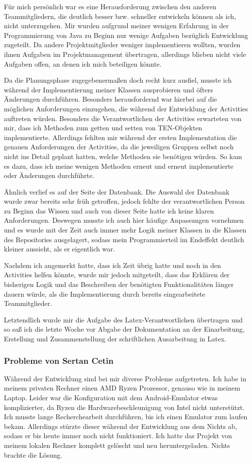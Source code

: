 Für mich persönlich war es eine Herausforderung zwischen den anderen Teammitgliedern, die deutlich besser bzw. schneller entwickeln können als ich, nicht unterzugehen. Mir wurden aufgrund meiner wenigen Erfahrung in der Programmierung von Java zu Beginn nur wenige Aufgaben bezüglich Entwicklung zugeteilt. Da andere Projektmitglieder weniger implementieren wollten, wurden ihnen Aufgaben im Projektmanagement übertragen, allerdings blieben nicht viele Aufgaben offen, an denen ich mich beteiligen könnte.

Da die Planungsphase zugegebenermaßen doch recht kurz ausfiel, musste ich während der Implementierung meiner Klassen ausprobieren und öfters Änderungen durchführen. Besonders herausfordernd war hierbei auf die möglichen Anforderungen einzugehen, die während der Entwicklung der Activities auftreten würden. Besonders die Verantwortlichen der Activities erwarteten von mir, dass ich Methoden zum getten und setten von TEN-Objekten implementierte. Allerdings fehlten mir während der ersten Implementation die genauen Anforderungen der Activities, da die jeweiligen Gruppen selbst noch nicht ins Detail geplant hatten, welche Methoden sie benötigen würden. So kam es dazu, dass ich meine wenigen Methoden erneut und erneut implementierte oder Änderungen durchführte.

Ähnlich verlief es auf der Seite der Datenbank. Die Auswahl der Datenbank wurde zwar bereits sehr früh getroffen, jedoch fehlte der verantwortlichen Person zu Beginn das Wissen und auch von dieser Seite hatte ich keine klaren Anforderungen. Deswegen musste ich auch hier häufige Anpassungen vornehmen und es wurde mit der Zeit auch immer mehr Logik meiner Klassen in die Klassen des Repositories ausgelagert, sodass mein Programmierteil im Endeffekt deutlich kleiner aussieht, als er eigentlich war.

Nachdem ich angemerkt hatte, dass ich Zeit übrig hatte und noch in den Activities helfen könnte, wurde mir jedoch mitgeteilt, dass das Erklären der bisherigen Logik und das Beschreiben der benötigten Funktionalitäten länger dauern würde, als die Implementierung durch bereits eingearbeitete Teammitglieder.

Letztendlich wurde mir die Aufgabe des Latex-Verantwortlichen übertragen und so saß ich die letzte Woche vor Abgabe der Dokumentation an der Einarbeitung, Erstellung und Zusammenstellung der schriftlichen Ausarbeitung in Latex.

\subsubsection{Probleme von Sertan Cetin}
Während der Entwicklung sind bei mir diverse Probleme aufgetreten. Ich habe in meinem privaten Rechner einen AMD Ryzen Prozessor, genauso wie in meinem Laptop. Leider war die Konfiguration mit dem Android-Emulator etwas komplizierter, da Ryzen die Hardwarebeschleunigung von Intel nicht unterstützt. Ich musste lange Recherchearbeit durchführen, bis ich einen Emulator zum laufen bekam. Allerdings stürzte dieser während der Entwicklung aus dem Nichts ab, sodass er bis heute immer noch nicht funktioniert. Ich hatte das Projekt von meinem lokalen Rechner komplett gelöscht und neu heruntergeladen. Nichts brachte die Lösung.

